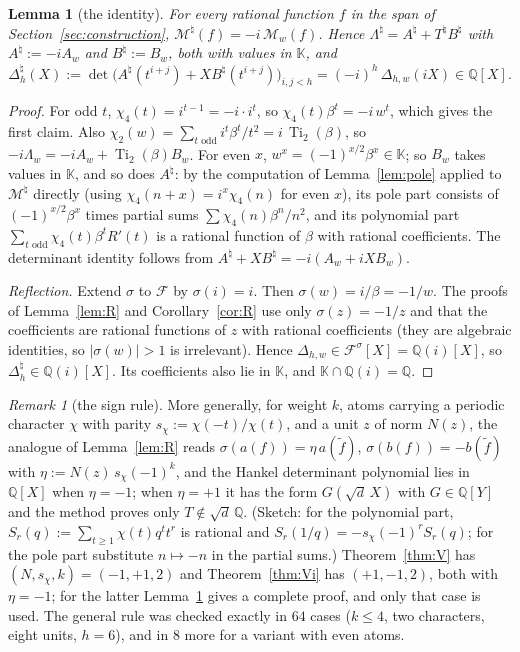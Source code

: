 \documentclass[11pt]{amsart}
\newtheorem{lemma}[theorem]{Lemma}
\theoremstyle{definition}
\theoremstyle{remark}
\newtheorem{remark}[theorem]{Remark}
\numberwithin{equation}{section}
\newcommand{\QQ}{\mathbb{Q}}
\newcommand{\KK}{\mathbb{K}}
\newcommand{\cF}{\mathcal{F}}
\newcommand{\cM}{\mathcal{M}}
\newcommand{\Ti}{\operatorname{Ti}}
\begin{document}
\begin{lemma}[the identity]\label{lem:identity}
For every rational function $f$ in the span of Section~\ref{sec:construction}, $\cM^\natural(f)=-i\,\cM_w(f)$. Hence
$\Lambda^\natural=A^\natural+T^\natural B^\natural$ with $A^\natural:=-iA_w$ and $B^\natural:=B_w$, both with values in
$\KK$, and
\[
  \Delta^\natural_h(X):=\det\bigl(A^\natural(t^{i+j})+XB^\natural(t^{i+j})\bigr)_{i,j<h}=(-i)^h\,\Delta_{h,w}(iX)\in\QQ[X].
\]
\end{lemma}

\begin{proof}
For odd $t$, $\chi_4(t)=i^{t-1}=-i\cdot i^t$, so $\chi_4(t)\beta^t=-i\,w^t$, which gives the first claim. Also
$\chi_2(w)=\sum_{t\text{ odd}}i^t\beta^t/t^2=i\,\Ti_2(\beta)$, so $-i\Lambda_w=-iA_w+\Ti_2(\beta)B_w$. For even $x$,
$w^x=(-1)^{x/2}\beta^x\in\KK$; so $B_w$ takes values in $\KK$, and so does $A^\natural$: by the computation of
Lemma~\ref{lem:pole} applied to $\cM^\natural$ directly (using $\chi_4(n+x)=i^x\chi_4(n)$ for even $x$), its pole part
consists of $(-1)^{x/2}\beta^x$ times partial sums $\sum\chi_4(n)\beta^n/n^2$, and its polynomial part
$\sum_{t\text{ odd}}\chi_4(t)\beta^tR'(t)$ is a rational function of $\beta$ with rational coefficients. The determinant
identity follows from $A^\natural+XB^\natural=-i(A_w+iXB_w)$.

\emph{Reflection.} Extend $\sigma$ to $\cF$ by $\sigma(i)=i$. Then $\sigma(w)=i/\beta=-1/w$. The proofs of
Lemma~\ref{lem:R} and Corollary~\ref{cor:R} use only $\sigma(z)=-1/z$ and that the coefficients are rational functions of
$z$ with rational coefficients (they are algebraic identities, so $|\sigma(w)|>1$ is irrelevant). Hence
$\Delta_{h,w}\in\cF^\sigma[X]=\QQ(i)[X]$, so $\Delta^\natural_h\in\QQ(i)[X]$. Its coefficients also lie in $\KK$, and
$\KK\cap\QQ(i)=\QQ$.
\end{proof}

\begin{remark}[the sign rule]\label{rem:signrule}
More generally, for weight $k$, atoms carrying a periodic character $\chi$ with parity $s_\chi:=\chi(-t)/\chi(t)$, and a
unit $z$ of norm $N(z)$, the analogue of Lemma~\ref{lem:R} reads $\sigma(a(f))=\eta\,a(\tilde f)$,
$\sigma(b(f))=-b(\tilde f)$ with $\eta:=N(z)\,s_\chi(-1)^k$, and the Hankel determinant polynomial lies in $\QQ[X]$ when
$\eta=-1$; when $\eta=+1$ it has the form $G(\sqrt d\,X)$ with $G\in\QQ[Y]$ and the method proves only $T\notin\sqrt d\,\QQ$.
(Sketch: for the polynomial part, $S_r(q):=\sum_{t\ge1}\chi(t)q^tt^r$ is rational and $S_r(1/q)=-s_\chi(-1)^rS_r(q)$; for
the pole part substitute $n\mapsto-n$ in the partial sums.) Theorem~\ref{thm:V} has $(N,s_\chi,k)=(-1,+1,2)$ and
Theorem~\ref{thm:Vi} has $(+1,-1,2)$, both with $\eta=-1$; for the latter Lemma~\ref{lem:identity} gives a complete
proof, and only that case is used. The general rule was checked exactly in $64$ cases ($k\le4$, two characters, eight
units, $h=6$), and in $8$ more for a variant with even atoms.
\end{remark}
\end{document}
